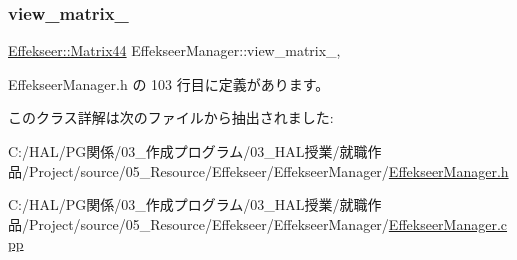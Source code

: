 \subsubsection{\texorpdfstring{view\+\_\+matrix\+\_\+}{view\_matrix\_}}
{\footnotesize\ttfamily \mbox{\hyperlink{struct_effekseer_1_1_matrix44}{Effekseer\+::\+Matrix44}} Effekseer\+Manager\+::view\+\_\+matrix\+\_\+\hspace{0.3cm}{\ttfamily [static]}, {\ttfamily [private]}}



 Effekseer\+Manager.\+h の 103 行目に定義があります。



このクラス詳解は次のファイルから抽出されました\+:\begin{DoxyCompactItemize}
\item 
C\+:/\+H\+A\+L/\+P\+G関係/03\+\_\+作成プログラム/03\+\_\+\+H\+A\+L授業/就職作品/\+Project/source/05\+\_\+\+Resource/\+Effekseer/\+Effekseer\+Manager/\mbox{\hyperlink{_effekseer_manager_8h}{Effekseer\+Manager.\+h}}\item 
C\+:/\+H\+A\+L/\+P\+G関係/03\+\_\+作成プログラム/03\+\_\+\+H\+A\+L授業/就職作品/\+Project/source/05\+\_\+\+Resource/\+Effekseer/\+Effekseer\+Manager/\mbox{\hyperlink{_effekseer_manager_8cpp}{Effekseer\+Manager.\+cpp}}\end{DoxyCompactItemize}
